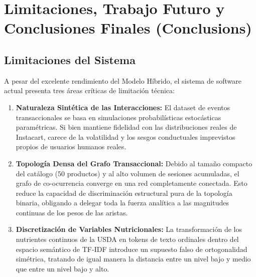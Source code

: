 \documentclass[11pt,a4paper]{article}
\begin{document}
\section{Limitaciones, Trabajo Futuro y Conclusiones Finales (Conclusions)}

\subsection{Limitaciones del Sistema}
A pesar del excelente rendimiento del Modelo Híbrido, el sistema de software actual presenta tres áreas críticas de limitación técnica:
\begin{enumerate}
    \item \textbf{Naturaleza Sintética de las Interacciones:} El dataset de eventos transaccionales se basa en simulaciones probabilísticas estocásticas paramétricas. Si bien mantiene fidelidad con las distribuciones reales de Instacart, carece de la volatilidad y los sesgos conductuales imprevistos propios de usuarios humanos reales.
    \item \textbf{Topología Densa del Grafo Transaccional:} Debido al tamaño compacto del catálogo (50 productos) y al alto volumen de sesiones acumuladas, el grafo de co-ocurrencia converge en una red completamente conectada. Esto reduce la capacidad de discriminación estructural pura de la topología binaria, obligando a delegar toda la fuerza analítica a las magnitudes continuas de los pesos de las aristas.
    \item \textbf{Discretización de Variables Nutricionales:} La transformación de los nutrientes continuos de la USDA en tokens de texto ordinales dentro del espacio semántico de TF-IDF introduce un supuesto falso de ortogonalidad simétrica, tratando de igual manera la distancia entre un nivel bajo y medio que entre un nivel bajo y alto.
\end{enumerate}
\end{document}
